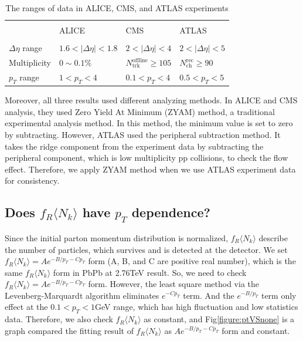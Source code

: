 \documentclass[jkps,fleqn,showpacs,showkeys]{revtex4}
\begin{document}
\begin{table}[ht]
  \centering
  \begin{tabular}{C{3cm} | C{3cm}  C{3cm}  C{3cm} } 
  \hline \\[-1 ex]
   & ALICE & CMS & ATLAS \\ [1 ex] \hline\hline \\[-1.5ex]
  $\Delta \eta $ range & $1.6<|\Delta \eta |<1.8$ & $2<|\Delta \eta |<4$ & $2<|\Delta \eta |<5$ \\ [1ex] 
  Multiplicity & $0\sim0.1\%$ & $N_{\text{trk}}^{\text{offline}} \geq 105$ & $N_{\text{ch}}^{\text{rec}} \geq 90$ \\[1ex] 
  $p_T$ range & $1<p_T<4$ & $0.1<p_T<4$ & $0.5<p_T<5$ \\[1 ex]
  \hline
 \end{tabular}
 \caption{The ranges of data in ALICE, CMS, and ATLAS experiments\cite{alice, cms, atlas}}
 \label{table:range}
\end{table}

Moreover, all three results used different analyzing methods.
In ALICE and CMS analysis, they used Zero Yield At Minimum (ZYAM) method, a traditional experimental analysis method.
In this method, the minimum value is set to zero by subtracting.
However, ATLAS used the peripheral subtraction method.
It takes the ridge component from the experiment data by subtracting the peripheral component, which is low multiplicity pp collisions, to check the flow effect.
Therefore, we apply ZYAM method when we use ATLAS experiment data for consistency.

\subsection{Does $f_R\langle N_k \rangle$ have $p_T$ dependence?}
\label{subsec: pT depnedence}

Since the initial parton momentum distribution is normalized, $f_R\langle N_k \rangle$ describe the number of particles, which survives and is detected at the detector.
We set $f_R\langle N_k \rangle = Ae^{-{B} / p_T -C p_{T}}$ form (A, B, and C are positive real number), which is the same $f_R\langle N_k \rangle$ form in PbPb at 2.76TeV result\cite{PbPb}.
So, we need to check $f_R\langle N_k \rangle = Ae^{-{B} / p_T -C p_{T}}$ form.
However, the least square method via the Levenberg-Marquardt algorithm eliminates $e^{-Cp_T}$ term.
And the $e^{-B/p_T}$ term only effect at the $0.1<p_T<1$GeV range, which has high fluctuation and low statistics data.
Therefore, we also check $f_R\langle N_k \rangle$ as constant, and Fig\ref{figure:ptVSnone} is a graph compared the fitting result of $f_R\langle N_k \rangle$ as $Ae^{-{B} / p_T -C p_{T}}$ form and constant.
\end{document}
